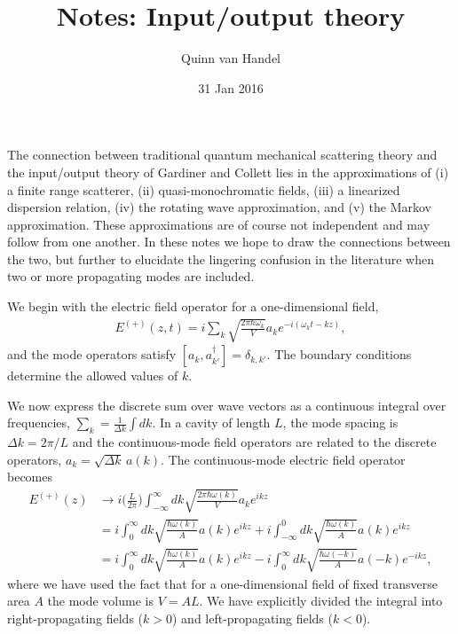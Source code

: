 \documentclass[pra]{revtex4}
\newcommand{\dg}{^\dagger}
\begin{document}
\title{Notes: Input/output theory}
\author{Quinn van Handel}
\noaffiliation
\date{31 Jan 2016}

\maketitle

The connection between traditional quantum mechanical scattering theory and the input/output theory of Gardiner and Collett lies in the approximations of (i) a finite range scatterer, (ii) quasi-monochromatic fields, (iii) a linearized dispersion relation, (iv) the rotating wave approximation, and (v) the Markov approximation. These approximations are of course not independent and may follow from one another. In these notes we hope to draw the connections between the two, but further to elucidate the lingering confusion in the literature when two or more propagating modes are included.

We begin with the electric field operator for a one-dimensional field, 
	\begin{align}
		E^{(+)}(z, t) = i\sum_{k} \sqrt{ \frac{ 2 \pi \hbar \omega_k}{V} } a_k e^{-i(\omega_k t - k z)},
	\end{align}
and the mode operators satisfy $[a_k, a\dg_{k'}] = \delta_{k,k'}$. The boundary conditions determine the allowed values of $k$. 
 
We now express the discrete sum over wave vectors as a continuous integral over frequencies, $\sum_k = \frac{1}{\Delta k } \int d k$. In a cavity of length $L$, the mode spacing is $\Delta k = 2 \pi/L$ and the continuous-mode field operators are related to the discrete operators, $a_k = \sqrt{\Delta k} \, a(k)$. The continuous-mode electric field operator becomes
 	\begin{align}
		E^{(+)}(z) & \rightarrow i\Big(\frac{L}{2 \pi} \Big) \int_{-\infty}^\infty dk \sqrt{ \frac{ 2 \pi \hbar \omega(k)}{V} } a_k e^{i k z} \\
		   		& =  i\int_0^\infty dk \sqrt{ \frac{ \hbar \omega(k)}{A} } a(k) e^{i k z} + i\int_{-\infty}^0 dk \sqrt{ \frac{ \hbar \omega(k)}{A} } a(k) e^{i k z}  \\
		  & =  i \int_0^\infty dk \sqrt{ \frac{ \hbar \omega(k)}{A} } a(k) e^{i k z} - i \int_{0}^\infty
		  dk \sqrt{ \frac{ \hbar \omega(-k)}{A} } a(-k) e^{-i k z} , \label{Eq::Efield1}
	\end{align}
where we have used the fact that for a one-dimensional field of fixed transverse area $A$ the mode volume is $V = A L$. 
We have explicitly divided the integral into right-propagating fields ($k>0$) and left-propagating fields ($k<0$).
 
\end{document}

